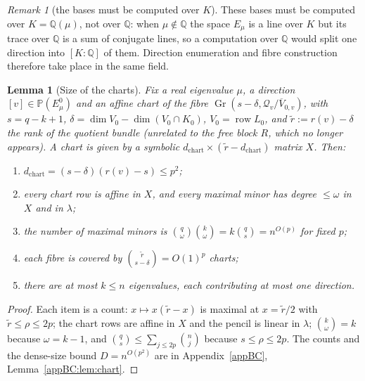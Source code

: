 \documentclass[journal]{IEEEtran}
\theoremstyle{plainn}
\newtheorem{lem}[thm]{Lemma}
\theoremstyle{remark}
\newtheorem{remark}{Remark}
\newcommand{\row}{\operatorname{row}}
\newcommand{\Gr}{\operatorname{Gr}}
\begin{document}
\begin{remark}[the bases must be computed over $K$]\label{sec5:rem:sameK}
These bases must be computed over $K=\mathbb{Q}(\mu)$, not over $\mathbb{Q}$: when $\mu\notin\mathbb{Q}$
the space $E_\mu$ is a line over $K$ but its trace over $\mathbb{Q}$ is a sum of conjugate lines, so a
computation over $\mathbb{Q}$ would split one direction into $[K:\mathbb{Q}]$ of them. Direction
enumeration and fibre construction therefore take place in the same field.
\end{remark}

\begin{lem}[Size of the charts]\label{sec5:sub:chart}\label{sec5:lem:chart}
Fix a real eigenvalue $\mu$, a direction $[v]\in\mathbb{P}(E_\mu^0)$ and an affine chart of the fibre
$\Gr(s-\delta,\mathcal{Q}_v/\overline{V}_{0,v})$, with $s=q-k+1$,
$\delta=\dim V_0-\dim(V_0\cap K_0)$, $V_0=\row L_0$, and $\widetilde r:=r(v)-\delta$ the rank of the
quotient bundle (unrelated to the free block $R$, which no longer appears). A chart is given by a
symbolic $d_{\mathrm{chart}}\times(\widetilde r-d_{\mathrm{chart}})$ matrix $X$. Then:
\begin{enumerate}[label=(\roman*),leftmargin=*]
\item $d_{\mathrm{chart}}=(s-\delta)(r(v)-s)\le p^{2}$;
\item every chart row is affine in $X$, and every maximal minor has degree $\le\omega$ in $X$ and in
$\lambda$;
\item the number of maximal minors is $\binom{q}{\omega}\binom{k}{\omega}=k\binom{q}{s}=n^{O(p)}$ for
fixed $p$;
\item each fibre is covered by $\binom{\widetilde r}{s-\delta}=O(1)^{p}$ charts;
\item there are at most $k\le n$ eigenvalues, each contributing at most one direction.
\end{enumerate}
\end{lem}

\begin{proof}
Each item is a count: $x\mapsto x(\widetilde r-x)$ is maximal at $x=\widetilde r/2$ with
$\widetilde r\le\rho\le2p$; the chart rows are affine in $X$ and the pencil is linear in $\lambda$;
$\binom{k}{\omega}=k$ because $\omega=k-1$, and $\binom{q}{s}\le\sum_{j\le2p}\binom{n}{j}$ because
$s\le\rho\le2p$. The counts and the dense-size bound $D=n^{O(p^{2})}$ are in Appendix~\ref{appBC},
Lemma~\ref{appBC:lem:chart}.
\end{proof}
\end{document}
